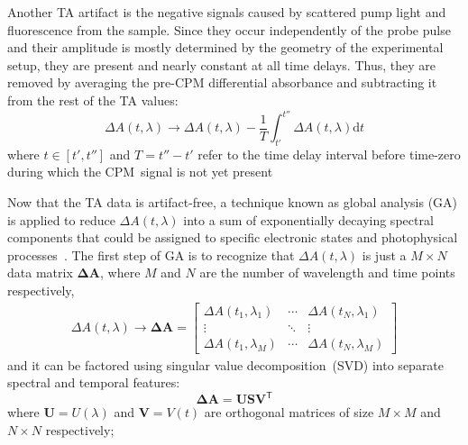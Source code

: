 Another TA artifact is the negative signals caused by scattered pump light
and fluorescence from the sample. Since they occur independently of the probe pulse
and their amplitude is mostly determined by the geometry of the experimental setup,
they are present and nearly constant at all time delays. Thus, they are
removed by averaging the pre-CPM differential absorbance and subtracting it
from the rest of the TA values:
%
\begin{equation}
  \Delta A(t, \lambda) \rightarrow \Delta A(t, \lambda) - \frac{1}{T}\int_{t'}^{t''} \Delta A(t, \lambda) \mathrm{d} t
  \label{eq: pre-signal}
\end{equation}
%
where $t \in [t', t'']$ and $T = t'' - t'$ refer to the time delay interval before time-zero
during which the CPM~signal is not yet present

Now that the TA data is artifact-free, a technique known as global analysis (GA)
is applied to reduce $\Delta A(t, \lambda)$ into a sum of exponentially decaying
spectral components that could be assigned to specific electronic states
and photophysical processes~\cite{Nagle1991, Grondelle2004, Wilderen2011, Ruckebusch2012}.
The first step of GA is to recognize that $\Delta A(t , \lambda)$ is just a
$ M \times N$ data matrix $\mathbf{\Delta \! A}$, where $M$ and $N$ are the number of wavelength
and time points respectively,
%
\begin{equation}
\begin{aligned}
  \Delta A(t, \lambda) \rightarrow \mathbf{\Delta \! A} =
  \begin{bmatrix}
      \Delta A(t_1, \lambda_1) & \cdots & \Delta A(t_N, \lambda_1) \\
      \vdots & \ddots & \vdots \\
      \Delta A(t_1, \lambda_M) & \cdots & \Delta A(t_N, \lambda_M)
  \end{bmatrix}
\end{aligned}
\end{equation}
%
and it can be factored using singular value decomposition~(SVD) into
separate spectral and temporal features:
%
\begin{equation}
  \mathbf{\Delta \! A} = \mathbf{U} \mathbf{S} \mathbf{V}^\mathsf{T}
\end{equation}
%
where $\mathbf{U} = U(\lambda)$ and $\mathbf{V} = V(t)$ are
orthogonal matrices of size $M \times M$ and $N \times N$ respectively;
